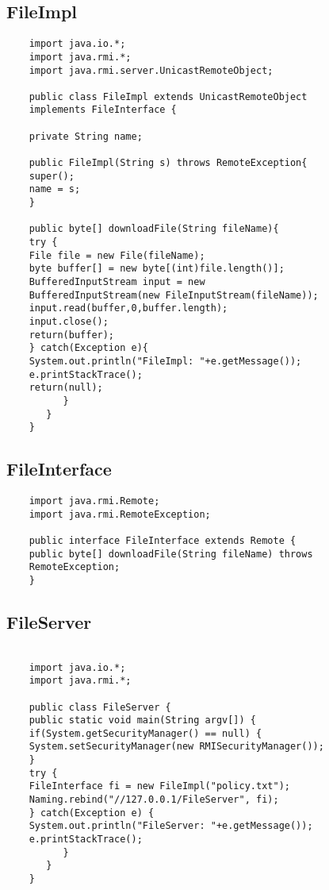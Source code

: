 \documentclass[12pt]{article}
\begin{document}
	\subsection{FileImpl}
	\begin{lstlisting}
	import java.io.*;
	import java.rmi.*;
	import java.rmi.server.UnicastRemoteObject;
	
	public class FileImpl extends UnicastRemoteObject
	implements FileInterface {
	
	private String name;
	
	public FileImpl(String s) throws RemoteException{
	super();
	name = s;
	}
	
	public byte[] downloadFile(String fileName){
	try {
	File file = new File(fileName);
	byte buffer[] = new byte[(int)file.length()];
	BufferedInputStream input = new
	BufferedInputStream(new FileInputStream(fileName));
	input.read(buffer,0,buffer.length);
	input.close();
	return(buffer);
	} catch(Exception e){
	System.out.println("FileImpl: "+e.getMessage());
	e.printStackTrace();
	return(null);
	      }
	   }
	}
	\end{lstlisting}
	
	\subsection{FileInterface}
	\begin{lstlisting}
	import java.rmi.Remote;
	import java.rmi.RemoteException;
	
	public interface FileInterface extends Remote {
	public byte[] downloadFile(String fileName) throws
	RemoteException;
	}
	\end{lstlisting}
	
	\subsection{FileServer}
	\begin{lstlisting}
	  
	import java.io.*;
	import java.rmi.*;
	
	public class FileServer {
	public static void main(String argv[]) {
	if(System.getSecurityManager() == null) {
	System.setSecurityManager(new RMISecurityManager());
	}
	try {
	FileInterface fi = new FileImpl("policy.txt");
	Naming.rebind("//127.0.0.1/FileServer", fi);
	} catch(Exception e) {
	System.out.println("FileServer: "+e.getMessage());
	e.printStackTrace();
	      }
	   }
	}

	\end{lstlisting}
	
\end{document}
